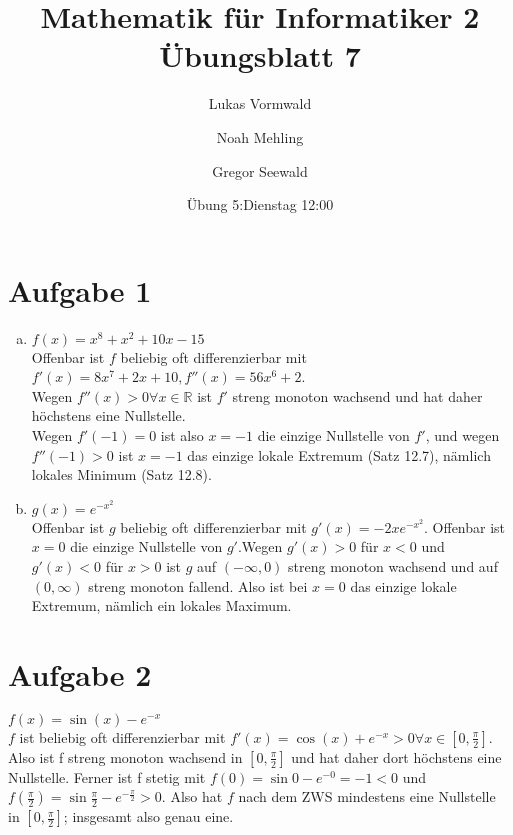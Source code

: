 \documentclass[11pt,a4paper]{article}
\title{Mathematik für Informatiker 2\\Übungsblatt 7}
\author{Lukas Vormwald \and Noah Mehling \and Gregor Seewald}
\date{Übung 5:Dienstag 12:00}
\begin{document}
  \section*{Aufgabe 1}
    \begin{enumerate}[a)]
      \item $f(x)=x^8+x^2+10x-15$\\
      Offenbar ist $f$ beliebig oft differenzierbar mit $f'(x)=8x^7+2x+10,f''(x)=56x^6+2$.\\
      Wegen $f''(x)>0 \forall x\in \mathbb{R}$ ist $f'$ streng monoton wachsend und hat daher höchstens eine Nullstelle.\\
      Wegen $f'(-1)=0$ ist also $x=-1$ die einzige Nullstelle von $f'$, und wegen $f''(-1)>0$ ist $x=-1$ das einzige lokale Extremum (Satz 12.7), nämlich lokales Minimum (Satz 12.8).
      \item $g(x)=e^{-x^2}$\\
      Offenbar ist $g$ beliebig oft differenzierbar mit $g'(x)=-2x e^{-x^2}$. Offenbar ist $x=0$ die einzige Nullstelle von $g'$.Wegen $g'(x)>0$ für $x<0$ und $g'(x)<0$ für $x>0$ ist $g$ auf $(-\infty,0)$ streng monoton wachsend und auf $(0,\infty)$ streng monoton fallend. Also ist bei $x=0$ das einzige lokale Extremum, nämlich ein lokales Maximum.
    \end{enumerate}
  \section*{Aufgabe 2}
    $f(x)=\sin(x)-e^{-x}$\\
    $f$ ist beliebig oft differenzierbar mit $f'(x)=\cos(x)+e^{-x}>0 \forall x\in \left[0,\frac{\pi}{2}\right]$. Also ist f streng monoton wachsend in $\left[0,\frac{\pi}{2}\right]$ und hat daher dort höchstens eine Nullstelle. Ferner ist f stetig mit $f(0)=\sin 0 - e^{-0}=-1<0$ und $f\left( \frac{\pi}{2} \right) = \sin \frac{\pi}{2} - e^{-\frac{\pi}{2}}>0 $. Also hat $f$ nach dem ZWS mindestens eine Nullstelle in $\left[ 0, \frac{\pi}{2}\right]$; insgesamt also genau eine.
\end{document}
